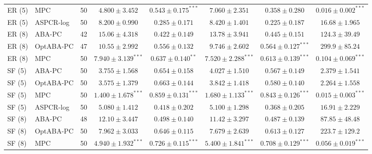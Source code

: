 \begin{table}[t]
{\begin{tabular}{llrccccc}
ER (5) & MPC & 50 & $4.800\pm3.452$ & $\mathbf{0.543\pm0.175}^{\ast\ast\ast}$ & $7.060\pm2.351$ & $0.358\pm0.280$ & $\mathbf{0.016\pm0.002}^{\ast\ast\ast}$\\
ER (5) & ASPCR-log & 50 & $8.200\pm0.990$ & $0.285\pm0.171$ & $8.420\pm1.401$ & $0.225\pm0.187$ & $16.68\pm1.965$\\
\midrule
ER (8) & ABA-PC & 42 & $15.06\pm4.318$ & $0.422\pm0.149$ & $13.78\pm3.941$ & $0.445\pm0.151$ & $124.3\pm39.49$\\
ER (8) & OptABA-PC & 47 & $10.55\pm2.992$ & $0.556\pm0.132$ & $9.746\pm2.602$ & $\mathbf{0.564\pm0.127}^{\ast\ast\ast}$ & $299.9\pm85.24$\\
ER (8) & MPC & 50 & $\mathbf{7.940\pm3.139}^{\ast\ast\ast}$ & $\mathbf{0.637\pm0.140}^{\ast\ast}$ & $\mathbf{7.520\pm2.288}^{\ast\ast\ast}$ & $\mathbf{0.613\pm0.139}^{\ast\ast\ast}$ & $\mathbf{0.104\pm0.069}^{\ast\ast\ast}$\\
\midrule
SF (5) & ABA-PC & 50 & $3.755\pm1.568$ & $0.654\pm0.158$ & $4.027\pm1.510$ & $0.567\pm0.149$ & $2.379\pm1.541$\\
SF (5) & OptABA-PC & 50 & $3.575\pm1.379$ & $0.663\pm0.144$ & $3.842\pm1.418$ & $0.580\pm0.140$ & $2.264\pm1.558$\\
SF (5) & MPC & 50 & $\mathbf{1.400\pm1.678}^{\ast\ast\ast}$ & $\mathbf{0.859\pm0.131}^{\ast\ast\ast}$ & $\mathbf{1.680\pm1.133}^{\ast\ast\ast}$ & $\mathbf{0.843\pm0.126}^{\ast\ast\ast}$ & $\mathbf{0.015\pm0.003}^{\ast\ast\ast}$\\
SF (5) & ASPCR-log & 50 & $5.080\pm1.412$ & $0.418\pm0.202$ & $5.100\pm1.298$ & $0.368\pm0.205$ & $16.91\pm2.229$\\
\midrule
SF (8) & ABA-PC & 48 & $12.10\pm3.447$ & $0.498\pm0.140$ & $11.42\pm3.297$ & $0.487\pm0.139$ & $87.85\pm48.48$\\
SF (8) & OptABA-PC & 50 & $7.962\pm3.033$ & $0.646\pm0.115$ & $7.679\pm2.639$ & $0.613\pm0.127$ & $223.7\pm129.2$\\
SF (8) & MPC & 50 & $\mathbf{4.940\pm1.932}^{\ast\ast\ast}$ & $\mathbf{0.726\pm0.115}^{\ast\ast\ast}$ & $\mathbf{5.400\pm1.841}^{\ast\ast\ast}$ & $\mathbf{0.708\pm0.129}^{\ast\ast\ast}$ & $\mathbf{0.056\pm0.019}^{\ast\ast\ast}$\\
\bottomrule
\end{tabular}%
}
\end{table}

